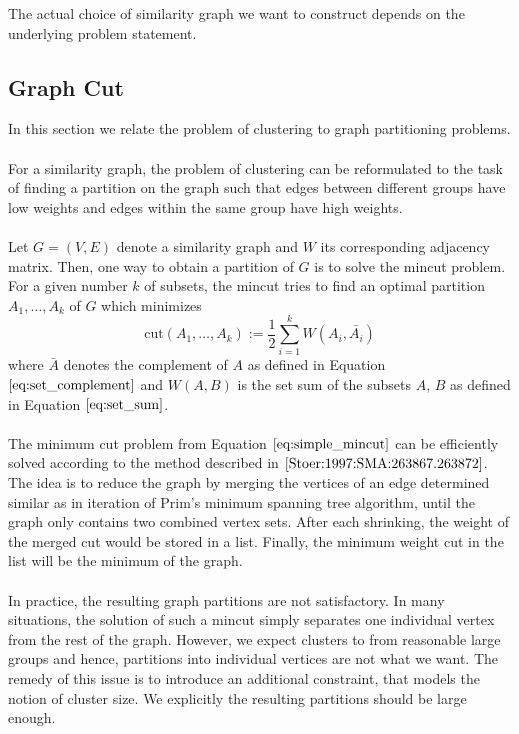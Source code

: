 The actual choice of similarity graph we want to construct depends on the underlying problem statement.

\subsection{Graph Cut}
\label{sec:graph_cut}
In this section we relate the problem of clustering to graph partitioning problems. \\ \\
For a similarity graph, the problem of clustering can be reformulated to the task of finding a partition on the graph such that edges between different groups have low weights and edges within the same group have high weights. \\ \\
Let $G = (V, E)$ denote a similarity graph and $W$ its corresponding adjacency matrix. Then, one way to obtain a partition of $G$ is to solve the mincut problem. For a given number $k$ of subsets, the mincut tries to find an optimal partition $A_1, \dots, A_k$ of $G$ which minimizes
\begin{equation}
\text{cut} \left( A_1, \dots, A_k \right) := \frac{1}{2} \sum_{i=1}^k W \left( A_i, \bar{A_i} \right)
\label{eq:simple_mincut} 
\end{equation}
where $\bar{A}$ denotes the complement of $A$ as defined in Equation $\ref{eq:set_complement}$ and $W(A,B)$ is the set sum of the subsets $A$, $B$ as defined in Equation $\ref{eq:set_sum}$. \\ \\
The minimum cut problem from Equation $\ref{eq:simple_mincut}$ can be efficiently solved according to the method described in $\cite{Stoer:1997:SMA:263867.263872}$. The idea is to reduce the graph by merging the vertices of an edge determined similar as in iteration of Prim's minimum spanning tree algorithm, until the graph only contains two combined vertex sets. After each shrinking, the weight of the merged cut would be stored in a list. Finally, the minimum weight cut in the list will be the minimum of the graph. \\ \\
In practice, the resulting graph partitions are not satisfactory. In many situations, the solution of such a mincut simply separates one individual vertex from the rest of the graph. However, we expect clusters to from reasonable large groups and hence, partitions into individual vertices are not what we want. The remedy of this issue is to introduce an additional constraint, that models the notion of cluster size. We explicitly the resulting partitions should be large enough. 
